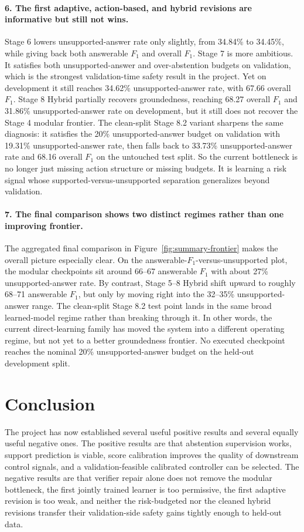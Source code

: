 \documentclass[10pt,twocolumn]{article}
\begin{document}
\paragraph{6. The first adaptive, action-based, and hybrid revisions are
informative but still not wins.}
Stage 6 lowers unsupported-answer rate only slightly, from 34.84\% to 34.45\%,
while giving back both answerable \(F_1\) and overall \(F_1\).
Stage 7 is more ambitious.
It satisfies both unsupported-answer and over-abstention budgets on validation,
which is the strongest validation-time safety result in the project.
Yet on development it still reaches 34.62\% unsupported-answer rate, with
67.66 overall \(F_1\).
Stage 8 Hybrid partially recovers groundedness, reaching 68.27 overall \(F_1\)
and 31.86\% unsupported-answer rate on development, but it still does not
recover the Stage 4 modular frontier.
The clean-split Stage 8.2 variant sharpens the same diagnosis:
it satisfies the 20\% unsupported-answer budget on validation with 19.31\%
unsupported-answer rate, then falls back to 33.73\% unsupported-answer rate
and 68.16 overall \(F_1\) on the untouched test split.
So the current bottleneck is no longer just missing action structure or missing
budgets.
It is learning a risk signal whose supported-versus-unsupported separation
generalizes beyond validation.

\paragraph{7. The final comparison shows two distinct regimes rather than one
improving frontier.}
The aggregated final comparison in Figure~\ref{fig:summary-frontier} makes the
overall picture especially clear.
On the answerable-\(F_1\)-versus-unsupported plot, the modular checkpoints sit
around 66--67 answerable \(F_1\) with about 27\% unsupported-answer rate.
By contrast, Stage 5--8 Hybrid shift upward to roughly 68--71 answerable
\(F_1\), but only by moving right into the 32--35\% unsupported-answer range.
The clean-split Stage 8.2 test point lands in the same broad learned-model
regime rather than breaking through it.
In other words, the current direct-learning family has moved the system into a
different operating regime, but not yet to a better groundedness frontier.
No executed checkpoint reaches the nominal 20\% unsupported-answer budget on
the held-out development split.

\section{Conclusion}
The project has now established several useful positive results and several
equally useful negative ones.
The positive results are that abstention supervision works, support prediction
is viable, score calibration improves the quality of downstream control
signals, and a validation-feasible calibrated controller can be selected.
The negative results are that verifier repair alone does not remove the modular
bottleneck, the first jointly trained learner is too permissive, the first
adaptive revision is too weak, and neither the risk-budgeted nor the cleaned
hybrid revisions transfer their validation-side safety gains tightly enough to
held-out data.
\end{document}
